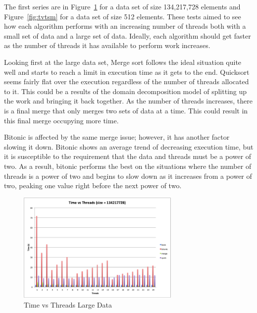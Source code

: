 \documentclass[journal]{IEEEtran}
\begin{document}
The first series are in Figure~\ref{fig:tvtlg} for a data set of size 134,217,728 elements and Figure~\ref{fig:tvtsm} for a data set of size 512 elements. These tests aimed to see how each algorithm performs with an increasing number of threads both with a small set of data and a large set of data. Ideally, each algorithm should get faster as the number of threads it has available to perform work increases.

Looking first at the large data set, Merge sort follows the ideal situation quite well and starts to reach a limit in execution time as it gets to the end. Quicksort seems fairly flat over the execution regardless of the number of threads allocated to it. This could be a results of the domain decomposition model of splitting up the work and bringing it back together. As the number of threads increases, there is a final merge that only merges two sets of data at a time. This could result in this final merge occupying more time. 

Bitonic is affected by the same merge issue; however, it has another factor slowing it down. Bitonic shows an average trend of decreasing execution time, but it is susceptible to the requirement that the data and threads must be a power of two. As a result, bitonic performs the best on the situations where the number of threads is a power of two and begins to slow down as it increases from a power of two, peaking one value right before the next power of two.  


\begin{figure}[!t]
  \centering
  \includegraphics[width=0.7\textwidth]{tvtlg}
  \caption{Time vs Threads Large Data}
  \label{fig:tvtlg}
\end{figure}
\end{document}
